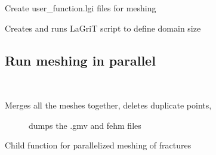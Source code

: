 \documentclass[letterpaper,10pt,english]{sphinxmanual}
\begin{document}

\begin{fulllineitems}
\label{\detokenize{pydfnworks:pydfnworks.lagrit_scripts.create_user_functions}}
Create user\_function.lgi files for meshing

\end{fulllineitems}


\begin{fulllineitems}
\label{\detokenize{pydfnworks:pydfnworks.lagrit_scripts.define_zones}}
Creates and runs LaGriT script to define domain size

\end{fulllineitems}



\subsection{Run meshing in parallel}
\label{\detokenize{pydfnworks:run-meshing-in-parallel}}\label{\detokenize{pydfnworks:module-pydfnworks.run_meshing}}\label{\detokenize{pydfnworks:module-run_meshing.py}}

\begin{fulllineitems}
\label{\detokenize{pydfnworks:pydfnworks.run_meshing.merge_the_meshes}}~\begin{description}
\item[{Merges all the meshes together, deletes duplicate points, }] \leavevmode
dumps the .gmv and fehm files

\end{description}

\end{fulllineitems}


\begin{fulllineitems}
\label{\detokenize{pydfnworks:pydfnworks.run_meshing.mesh_fracture}}
Child function for parallelized meshing of fractures

\end{fulllineitems}
\end{document}
